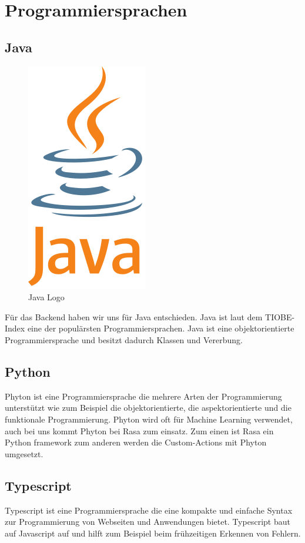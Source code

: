\section{Programmiersprachen}

\subsection{Java}

\begin{figure}[hbt!]
    \centering
    \includegraphics[scale=0.5]{pics/java}
    \caption{Java Logo\cite{java}}
    \label{fig:impl:java}
\end{figure}

Für das Backend haben wir uns für Java entschieden.
Java ist laut dem TIOBE-Index\cite{tiobe} eine der populärsten Programmiersprachen.
Java ist eine objektorientierte Programmiersprache und besitzt dadurch Klassen und Vererbung\cite{java}.

\subsection{Python}
Phyton ist eine Programmiersprache die mehrere Arten der Programmierung unterstützt wie zum Beispiel die objektorientierte, die aspektorientierte und die funktionale Programmierung.
Phyton wird oft für Machine Learning verwendet, auch bei uns kommt Phyton bei Rasa zum einsatz.
Zum einen ist Rasa ein Python framework zum anderen werden die Custom-Actions mit Phyton umgesetzt.

\subsection{Typescript}
Typescript ist eine Programmiersprache die eine kompakte und einfache Syntax zur Programmierung von Webseiten und Anwendungen bietet.
Typescript baut auf Javascript auf und hilft zum Beispiel beim frühzeitigen Erkennen von Fehlern.

